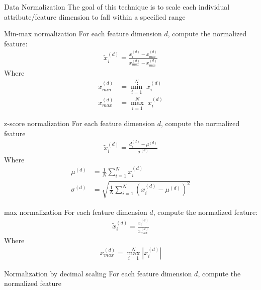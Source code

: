 \begin{parag}{Data Normalization}
    The goal of this technique is to scale each individual attribute/feature dimension to fall within a specified range
	\begin{subparag}{Min-max normalization}
	    For each feature dimension $d$, compute the normalized feature:
		\begin{align*} 
			\widetilde{x}_i^{\left(d\right)} = \frac{x_i^{\left(d\right)}-x_{min}^{\left(d\right)}}{x_{max}^{\left(d\right)}-x_{min}^{\left(d\right)}}
		\end{align*}
		Where
		\begin{align*} 
			x_{min}^{\left(d\right)} &= \overset{N}{\min_{i= 1}} \; x_i^{\left(d\right)}\\
			x_{max}^{\left(d\right)} &= \overset{N}{\max_{i= 1}} \; x_i^{\left(d\right)}
		\end{align*}
	\end{subparag}
	\begin{subparag}{z-score normalization}
	    For each feature dimension $d$, compute the normalized feature
		\begin{align*} 
			\widetilde{x}_{i}^{\left(d\right)} =  \frac{d_i^{\left(d\right)} - \mu^{\left(d\right)}}{\sigma^{\left(d\right)}}
		\end{align*}
		Where 
		\begin{align*} 
			\mu^{\left(d\right)} &= \frac{1}{N} \sum_{i= 1}^{N}x_i^{\left(d\right)}\\
							\sigma^{\left(d\right)}	 &= \sqrt{\frac{1}{N}\sum_{i= 1}^{N}\left(x_i^{\left(d\right)} - \mu^{\left(d\right)}\right)^2}
		\end{align*}
	\end{subparag}
	\begin{subparag}{max normalization}
	    For each feature dimension $d$, compute the normalized feature:
		\begin{align*} 
			\widetilde{x}_i^{\left(d\right)} = \frac{x_i^{\left(d\right)}}{x_{max}^{\left(d\right)}}
		\end{align*}
		Where 
		\begin{align*} 
			x_{max}^{\left(d\right)} =  \overset{N}{\max_{i= 1}}\left|x_i^{\left(d\right)}\right|
		\end{align*}
	\end{subparag}
	\begin{subparag}{Normalization by decimal scaling}
	    For each feature dimension $d$, compute the normalized feature 
		\begin{align*} 

\end{align*}
\end{subparag}
\end{parag}
